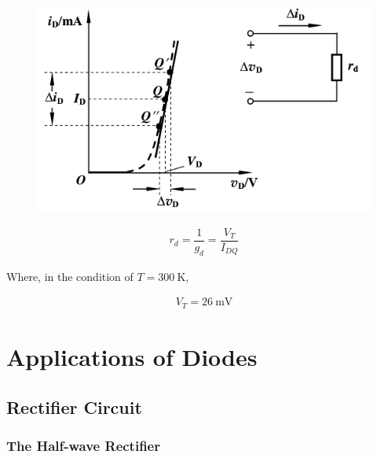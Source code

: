 \begin{figure}[H]
  \centering
  \includegraphics[width=0.9\linewidth]{figures/Diode-Small-Signal}
\end{figure}

\begin{equation*}
  \begin{aligned}
    r_d = \dfrac{1}{g_d} = \dfrac{V_T}{I_{DQ}}  
  \end{aligned}
\end{equation*}

Where, in the condition of $T = 300 \  \mathrm{K}$,

\begin{equation*}
  \begin{aligned}
    V_T = 26 \  \mathrm{mV}
  \end{aligned}
\end{equation*}

\section{Applications of Diodes}

\subsection{Rectifier Circuit}

\subsubsection{The Half-wave Rectifier}

